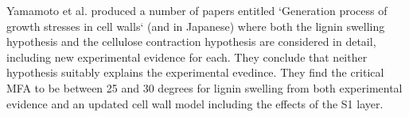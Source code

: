 Yamamoto et al. produced a number of papers entitled `Generation process of
growth stresses in cell walls` \citep{ISI:A1991FD97000001,ISI:A1992HP18200001,ISI:A1993LM28800002,ISI:A1993LE99600003,ISI:A1995QJ03000001} (and \citep{ISI:A1988R357800002,ISI:A1990EL71100002} in Japanese) where both the lignin swelling
hypothesis and the cellulose contraction hypothesis are considered in detail,
including new experimental evidence for each. They conclude that neither hypothesis suitably explains the experimental evedince. They find the critical MFA to be between 25 and 30 degrees for lignin swelling from both experimental evidence and an updated cell wall model including the effects of the S1 layer. 